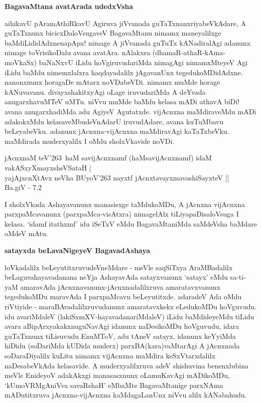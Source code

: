 {\bigskip
\noindent
{\large\bf BagavaMtana avatArada udedxVsha}}\label{page72}
\medskip

\noindent
aihikavU pAramAthiRkavU Agiruva jiVvanada guTaTxnanxriyabeVkAdare, A guTaTxnunx bicicxDaloVsu\-gaveV BagavaMtanu nimamx maneyalilxge baMdiLididAdxnenapApx! nimage A jiVvanada guTuTx kANadiralAgi adanunx\- ni\-mage toVrisikoDalu avana avatAra. nAlakxra (dhamaR-athaR-kAma-moVkaSx) baNaNxvU iLidu hoVgi\-ruvudariMda nimagAgi nimamxMteyeV Agi iLidu baMdu nimemxlalxra haqdayadalilx jAgavanUnx tegedu\-koMDi\-dAdxne. nananxnunx horagaDe mAtarx noVDabeVDi. nimamx muMde horage kANuvavanu. divayxshakitx\-yAgi oLage iruvudariMda A deYvada anugarxhavuMTeV uMTu. niVvu muMde baMdu kelasa mADi athavA biDi! avana anugarxhadiMda adu AgiyeV Agutatxde. vijAcnxna maMdiraveMdu mADi adakokxMdu kelasa\-veMbudeVnAdarU iruvudAdare, avana kuTuMbavu beLeyabeVku. adanunx jAcnxna-vijAcnxna maMdira\-vAgi kaTaTxbeVku. maMdirada muderxyalilx I oMdu sholxVkavide noVDi.

\begin{shloka}
jAcnxnaM teV\char'263 \,haM savijAcnxnamf (haMsavijAcnxnamf) idaM vakASxyXmayxsheVSataH |\\\label{72}
yajAjxcnXtAvx neVha BUyoV\char'263 nayxtf jAcnxtavayxmavashiSayxteV ||\\
 \hfill{Ba.giV - 7.2}
\end{shloka}

\noindent
I sholxVkada Ashayavanunx manasisxge taMdukoMDu, A jAcnxna vijAcnxna parxpaMcavanunx (parxpaMca-visAtxra) nimagelAlx tiLiyapaDisaloVsuga I kelasa. `idamf itathxmf' idu iSeTxV eMdu BagavaMtaniMda saMdeVsha baMdare oMdeV mAtu.

{\bigskip
\noindent
{\large\bf satayxda beLavaNigeyeV BagavadAshaya}}\label{page72}
\medskip

\noindent
loVkadalilx beLeyutitxruvudeVneMdare - meVle saqSiTxya AraMBadalilx beLaguva\break hayavadanana neYja Ashaya\-vAda satayxvanunx `satayx' eMdu sa-ti-yaM amaravAda jAcnxnavanunx-jAcnxnadalilxruva amaratavxvanunx tegedu\-koMDu maravAda I parxpaMcavu beLeyutitxde. adaradeV Ada oMdu riVtiyide - maraBAvadalilxru\-vudanunx ama\-ratavxkekx eLedukoMDu hoVguvudu. idu avariMdaleV (lakiSxmXV-hayavadana\-riMdaleV) iLidu baMdideyeMdu tiLidu avara aBipArxyakakxnuguNavAgi idanunx naDesikoMDu hoVguvudu, idara guTaTxnunx tiLisuvudu EnuMToV, adu tAneV satayx. idanunx keYyiMda hiDidu (soDariMda kU\-Dida muderx) parxBA(kara)vaMtarAgi A jAcnxnada soDaraDiyalilx kuLitu nimamx vijAcnxna maMdira keSxVtarx\-dalilx naDesabeVkAda kelasavide. A muderxyalilxruva adeV shishuvina benenxlubina meVle EnideyoV adakAkxgi manasasxnunx oLamuKavAgi mADikoMDu, `kUmoVRMgAniVva savaRshaH'\label{73} eMbaMte BagavaMtanige \-parxNAma mADutitxruva jAcnxna-vijAcnxna kaMdagaLanUnx niVvu alilx kANabahudu.

